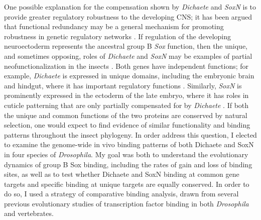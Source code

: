 One possible explanation for the compensation shown by \emph{Dichaete} and \emph{SoxN} is to provide greater regulatory robustness to the developing CNS; it has been argued that functional redundancy may be a general mechanism for promoting robustness in genetic regulatory networks  \citep{nowak_evolution_1997,tautz_redundancies_1992,wagner_distributed_2005,wagner_gene_2008}. If regulation of the developing neuroectoderm represents the ancestral group B \emph{Sox} function, then the unique, and sometimes opposing, roles of \emph{Dichaete} and \emph{SoxN} may be examples of partial neofunctionalization in the insects \citep{ferrero_soxneuro_2014}. Both genes have independent functions; for example, \emph{Dichaete} is expressed in unique domains, including the embryonic brain and hindgut, where it has important regulatory functions \citep{sanchez-soriano_regulatory_2000}. Similarly, \emph{SoxN} is prominently expressed in the ectoderm of the late embryo, where it has roles in cuticle patterning that are only partially compensated for by \emph{Dichaete} \citep{overton_drosophila_2007}. If both the unique and common functions of the two proteins are conserved by natural selection, one would expect to find evidence of similar functionality and binding patterns throughout the insect phylogeny. In order address this question, I elected to examine the genome-wide in vivo binding patterns of both Dichaete and SoxN in four species of \emph{Drosophila}. My goal was both to understand the evolutionary dynamics of group B Sox binding, including the rates of gain and loss of binding sites, as well as to test whether Dichaete and SoxN binding at common gene targets and specific binding at unique targets are equally conserved. In order to do so, I used a strategy of comparative binding analysis, drawn from several previous evolutionary studies of transcription factor binding in both \emph{Drosophila} and vertebrates.


